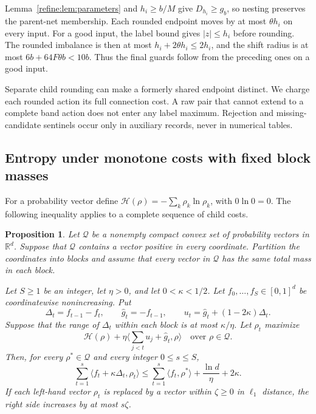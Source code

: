 \documentclass[11pt]{article}
\newtheorem{proposition}[theorem]{Proposition}
\theoremstyle{definition}
\newcommand{\1}{\mathbf 1}
\newcommand{\HH}{\mathcal H}
\newcommand{\QQ}{\mathcal Q}
\newcommand{\ip}[2]{\langle #1,#2\rangle}
\begin{document}
Lemma~\ref{refine:lem:parameters} and $h_i\ge b/M$ give
$D_{h_i}\ge g_b$, so nesting preserves the parent-net membership.
Each rounded endpoint moves by at most $\theta h_i$ on every input.
For a good input, the label bound gives $|z|\le h_i$ before rounding.
The rounded imbalance is then at most $h_i+2\theta h_i\le2h_i$, and the
shift radius is at most $6b+64F\theta b<10b$. Thus the final guards
follow from the preceding ones on a good input.

Separate child rounding can make a formerly shared endpoint distinct.
We charge each rounded action its full connection cost.
A raw pair that cannot extend to a complete band action does not enter
any label maximum. Rejection and missing-candidate sentinels occur only
in auxiliary records, never in numerical tables.

\subsection{Entropy under monotone costs with fixed block masses}\label{analytic:sec:entropy}

For a probability vector define
$\HH(\rho)=-\sum_k\rho_k\ln\rho_k$, with $0\ln0=0$.
The following inequality applies to a complete sequence of child costs.

\begin{proposition}\label{analytic:prop:entropy}
Let $\QQ$ be a nonempty compact convex set of probability vectors in
$\mathbb R^d$. Suppose that $\QQ$ contains a vector positive in every
coordinate. Partition the coordinates into blocks and assume that every
vector in $\QQ$ has the same total mass in each block.

Let $S\ge1$ be an integer, let $\eta>0$, and let $0<\kappa<1/2$.
Let $f_0,\ldots,f_S\in[0,1]^d$ be coordinatewise nonincreasing. Put
\[
 \Delta_t=f_{t-1}-f_t,\qquad
 \widehat g_t=-f_{t-1},\qquad
 u_t=\widehat g_t+(1-2\kappa)\Delta_t.
\]
Suppose that the range of $\Delta_t$ within each block is at most
$\kappa/\eta$. Let $\rho_t$ maximize
\[
 \HH(\rho)+\eta\ip{\sum_{j<t}u_j+\widehat g_t}{\rho}
 \quad\text{over }\rho\in\QQ.
\]
Then, for every $\rho^*\in\QQ$ and every integer $0\le s\le S$,
\[
 \sum_{t=1}^s\ip{f_t+\kappa\Delta_t}{\rho_t}
 \le \sum_{t=1}^s\ip{f_t}{\rho^*}
       +\frac{\ln d}{\eta}+2\kappa.
\]
If each left-hand vector $\rho_t$ is replaced by a vector within
$\zeta\ge0$ in $\ell_1$ distance, the right side increases by at most
$s\zeta$.
\end{proposition}
\end{document}
